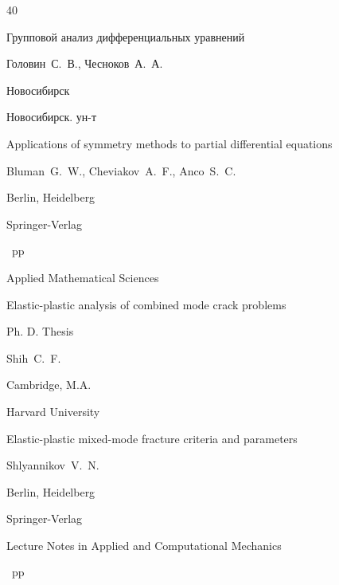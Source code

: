 \begin{thebibliography}{40}

\book Групповой анализ дифференциальных уравнений

\by Головин~С.~В., Чесноков~А.~А.

\publaddr Новосибирск

\publ Новосибирск. ун-т






\book Applications of symmetry methods to partial differential equations

\by Bluman~G.~W., Cheviakov~A.~F., Anco~S.~C.

\publaddr Berlin, Heidelberg

\publ Springer-Verlag


~pp \nofrills


\serial Applied Mathematical Sciences





\thesis Elastic-plastic analysis of combined mode crack problems

\thesisinfo Ph. D. Thesis

\by Shih~C.~F.

\publaddr Cambridge, M.A.

\publ Harvard University





\book Elastic-plastic mixed-mode fracture criteria and parameters

\by Shlyannikov~V.~N.

\publaddr Berlin, Heidelberg

\publ Springer-Verlag


\serial Lecture Notes in Applied and Computational Mechanics


~pp \nofrills






\end{thebibliography}
